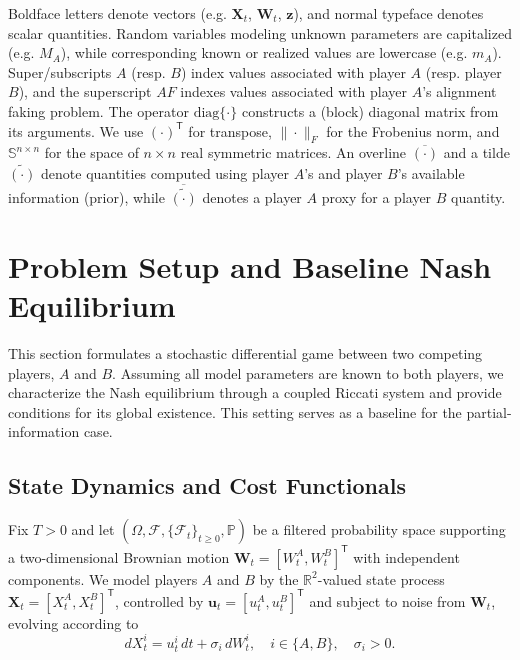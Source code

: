 \documentclass[letterpaper, 10 pt, conference]{ieeeconf}
\newcommand{\Prob}{\mathbb P}
\newcommand{\F}{\mathcal F}
\newcommand{\R}{\mathbb R}
\newcommand{\diag}{\mathrm{diag}}
\newcommand{\transpose}{^\mathsf{T}}
\begin{document}
{}
Boldface letters denote vectors (e.g. $\bm{X}_t$, $\bm{W}_t$, $\bm{z}$), and normal typeface denotes scalar quantities. 
Random variables modeling unknown parameters are capitalized (e.g. $M_A$), while corresponding known or realized values are lowercase (e.g. $m_A$).
Super/subscripts $A$ (resp. $B$) index values associated with player $A$ (resp. player $B$), and the superscript $AF$ indexes values associated with player $A$'s alignment faking problem.  
The operator $\diag\{\cdot\}$ constructs a (block) diagonal matrix from its arguments.  We use $(\cdot)\transpose$ for transpose, $\|\cdot\|_F$ for the Frobenius norm, and $\mathbb{S}^{n\times n}$ for the space of $n\times n$ real symmetric matrices.  An overline $\overline{(\cdot)}$ and a tilde $\widetilde{(\cdot)}$ denote quantities computed using player $A$'s and player $B$'s available information (prior), while $\overline{\widetilde{(\cdot)}}$ denotes a player $A$ proxy for a player $B$ quantity. 

\section{Problem Setup and Baseline Nash Equilibrium}\label{sec:setup}

This section formulates a stochastic differential game between two competing players, \(A\) and \(B\). Assuming all model parameters are known to both players, we characterize the Nash equilibrium through a coupled Riccati system and provide conditions for its global existence. This setting serves as a baseline for the partial-information case.

\subsection{State Dynamics and Cost Functionals}
Fix $T>0$ and let $(\Omega,\F, \{\F_t\}_{t\geq 0}, \Prob)$ be a filtered probability space supporting a two-dimensional Brownian motion $\bm{W}_t = [ W_t^A, W_t^B] \transpose$ with independent components.
We model players $A$ and $B$ by the $\R^2$-valued state process  $\bm{X}_t = [X_t^A, X_t^B]\transpose$, controlled by $\bm{u}_t = [ u_t^A, u_t^B]\transpose$ and subject to noise from $\bm{W}_t$, evolving according to
\begin{equation}\label{eq:state_dynamics}
   dX_t^i = u_t^i \, dt + \sigma_i \, dW_t^i, \quad  i \in \{A, B\}, \quad \sigma_i > 0. 
\end{equation}
\end{document}
